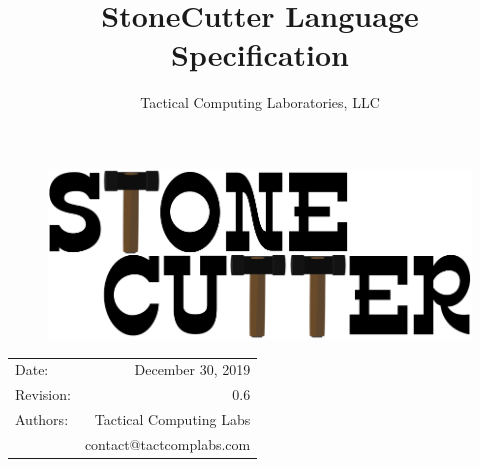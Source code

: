 \documentclass{article}
\title{StoneCutter Language\\Specification} %
\author{Tactical Computing Laboratories, LLC} %
\date{} %
\begin{document}
\begin{figure}
\begin{center}
\includegraphics[width=5in]{figures/stonecutter.png} %
\end{center}
\end{figure}

\maketitle %
\thispagestyle{fancy} %

\begin{center}
\begin{tabular}{l r}
Date: & December 30, 2019 \\ %
Revision: & 0.6 \\         %
Authors: & Tactical Computing Labs\\ %
& contact@tactcomplabs.com\\
\end{tabular}
\end{center}



\clearpage
\tableofcontents
\clearpage


\clearpage
\listoffigures
\lstlistoflistings
\listoftables
\clearpage
\end{document}

